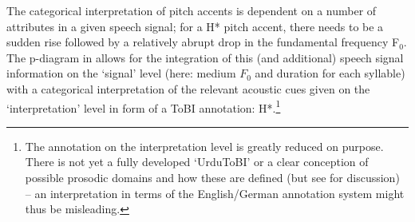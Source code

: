 \documentclass[output=paper,hidelinks]{langscibook}
\begin{document}
The categorical interpretation of pitch accents is dependent on a number of attributes in a given speech signal; for a H* pitch accent, there needs to be a sudden rise followed by a relatively abrupt drop in the fundamental frequency F$_0$. The p-diagram in  allows for the integration of this (and additional) speech signal information on the `signal' level  (here: medium $F_0$ and duration for each syllable) with a categorical interpretation of the relevant acoustic cues given on the `interpretation' level in form of a ToBI annotation: H*.\footnote{The annotation on the interpretation level is greatly reduced on purpose. There is not yet a fully developed `UrduToBI' or a clear conception of possible prosodic domains and how these are defined (but see \citealt{Uroojetal2019} for discussion) -- an interpretation in terms of the English/German annotation system might thus be misleading.} 
\end{document}
